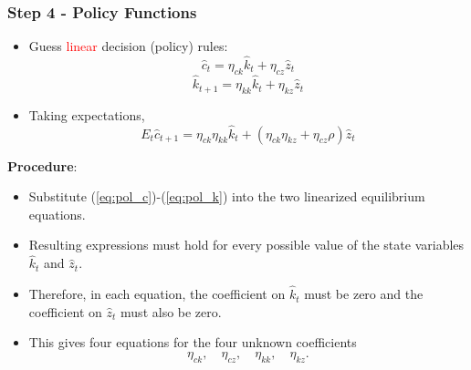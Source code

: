 \documentclass{beamer}
\begin{document}
\begin{frame}
\frametitle{Step 4 - Policy Functions}

\begin{itemize}
\item Guess \textcolor{red}{linear} decision (policy) rules:
\begin{equation}\tag{POL-C}\label{eq:pol_c}
\hat c_t = \eta_{ck}\hat k_t + \eta_{cz}\hat z_t
\end{equation}
\begin{equation}\tag{POL-K}\label{eq:pol_k}
\hat k_{t+1} = \eta_{kk}\hat k_t + \eta_{kz}\hat z_t
\end{equation}
\item Taking expectations,
\begin{equation*}
E_t \hat c_{t+1}
= \eta_{ck}\eta_{kk}\hat k_t
+ \left(\eta_{ck}\eta_{kz}+\eta_{cz}\rho\right)\hat z_t
\end{equation*}
\end{itemize}
\textbf{Procedure}:
\begin{itemize}
\item Substitute (\ref{eq:pol_c})-(\ref{eq:pol_k}) into the two linearized equilibrium equations.
\item Resulting expressions must hold for every possible value of the state variables $\hat k_t$ and $\hat z_t$.
\item Therefore, in each equation, the coefficient on $\hat k_t$ must be zero and the coefficient on $\hat z_t$ must also be zero.
\item This gives four equations for the four unknown coefficients
\[
\eta_{ck},\quad \eta_{cz},\quad \eta_{kk},\quad \eta_{kz}.
\]
\end{itemize}

\end{frame}
\end{document}
